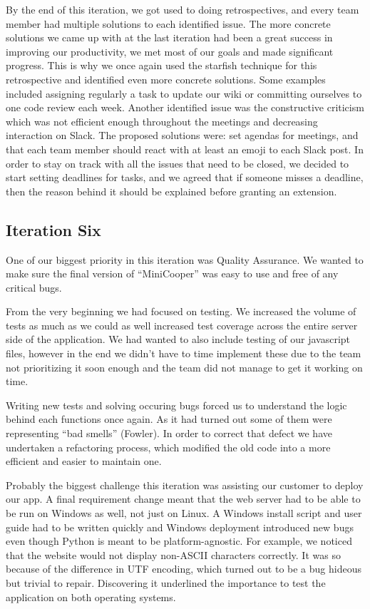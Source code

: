 \documentclass{l3proj}
\begin{document}
By the end of this iteration, we got used to doing retrospectives, and every team member had multiple solutions to each identified issue. The more concrete solutions we came up with at the last iteration had been a great success in improving our productivity, we met most of our goals and made significant progress. This is why we once again used the starfish technique for this retrospective and identified  even more concrete solutions. Some examples included assigning regularly a task to update our wiki or committing ourselves to one code review each week. Another identified issue was the constructive criticism which was not efficient enough throughout the meetings and decreasing interaction on Slack. The proposed solutions were: set agendas for meetings, and that each team member should react with at least an emoji to each Slack post.
In order to stay on track with all the issues that need to be closed, we decided to start setting deadlines for tasks, and we agreed that if someone misses a deadline, then the reason behind it should be explained before granting an extension.

\subsection{Iteration Six}

One of our biggest priority in this iteration was Quality Assurance. We wanted to make sure the final version of ``MiniCooper'' was easy to use and free of any critical bugs.

From the very beginning we had focused on testing.  We increased the volume of tests as much as we could as well increased test coverage across the entire server side of the application. We had wanted to also include testing of our javascript files, however in the end we didn’t have to time implement these due to the team not prioritizing it soon enough and the team did not manage to get it working on time.

Writing new tests and solving occuring bugs forced us to understand the logic behind each functions once again. As it had turned out some of them were representing ``bad smells'' (Fowler). In order to correct that defect we have undertaken a refactoring process, which modified the old code into a more efficient and easier to maintain one.

Probably the biggest challenge this iteration was assisting our customer to deploy our app. A final requirement change meant that the web server had to be able to be run on Windows as well, not just on Linux. A Windows install script and user guide had to be written quickly and Windows deployment introduced new bugs even though Python is meant to be platform-agnostic. For example, we noticed that the website would not display non-ASCII characters correctly. It was so because of the difference in UTF encoding, which turned out to be a bug hideous but trivial to repair. Discovering it underlined the importance to test the application on both operating systems.
\end{document}
